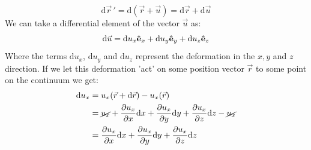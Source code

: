 \documentclass[11pt, a4paper]{article}
\renewcommand*{\d}{\text{d}}
\DeclareRobustCommand{\uvec}[1]{{%
  \ifcat\relax\noexpand#1%
    \bm{\hat{#1}}%
  \else
    \ifcsname uvec#1\endcsname
      \csname uvec#1\endcsname
    \else
      \bm{\hat{\mathbf{#1}}}%
     \fi
   \fi
}}
\numberwithin{equation}{section}
\begin{document}
\begin{equation}
  \d \vec{r}\,' = \d(\vec{r} + \vec{u}) = \d\vec{r} + \d\vec{u}
\end{equation}
We can take a differential element of the vector $\vec{u}$ as:
\begin{equation}
  \d \vec{u} =  \d u_x\uvec{e}_x + \d u_y\uvec{e}_y + \d u_z\uvec{e}_z
\end{equation}
Where the terms $\d u_x$, $\d u_y$ and $\d u_z$ represent the deformation in the $x, y$ and $z$ direction. If we let this deformation 'act' on some position vector $\vec{r}$ to some point on the continuum we get:
\begin{align}
  \d u_x &= u_x(\vec{r}+\d \vec{r}) - u_x(\vec{r})\\
         &= \cancel{u_x} + \frac{\partial u_x}{\partial x}\d x + \frac{\partial u_x}{\partial y} 
            \d y + \frac{\partial u_x}{\partial z}\d z - \cancel{u_x}\\
         &= \frac{\partial u_x}{\partial x}\d x + \frac{\partial u_x}{\partial y} 
         \d y + \frac{\partial u_x}{\partial z}\d z
\end{align}
\end{document}

